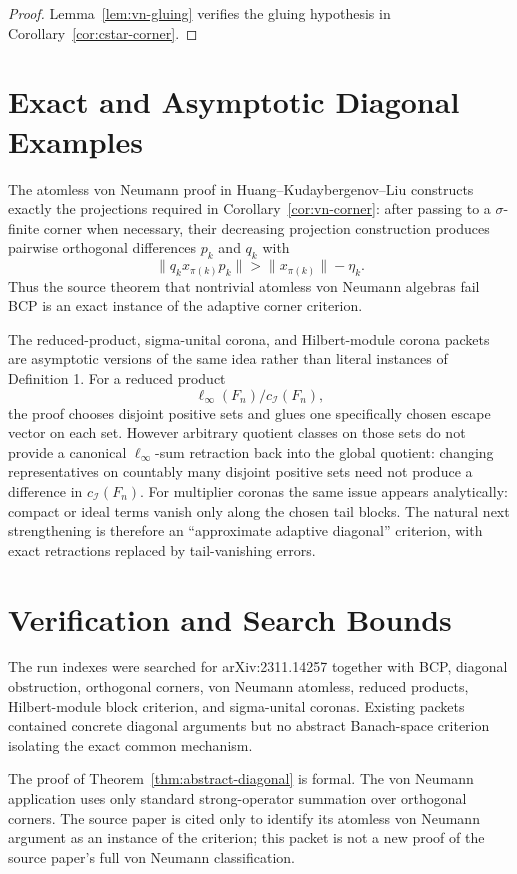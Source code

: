 \documentclass[11pt]{article}
\newcommand{\cI}{\mathcal I}
\begin{document}
\begin{proof}
Lemma~\ref{lem:vn-gluing} verifies the gluing hypothesis in
Corollary~\ref{cor:cstar-corner}.
\end{proof}

\section*{Exact and Asymptotic Diagonal Examples}

The atomless von Neumann proof in Huang--Kudaybergenov--Liu constructs exactly
the projections required in Corollary~\ref{cor:vn-corner}: after passing to a
\(\sigma\)-finite corner when necessary, their decreasing projection
construction produces pairwise orthogonal differences \(p_k\) and \(q_k\)
with
\[
        \|q_kx_{\pi(k)}p_k\|
        >
        \|x_{\pi(k)}\|-\eta_k .
\]
Thus the source theorem that nontrivial atomless von Neumann algebras fail
BCP is an exact instance of the adaptive corner criterion.

The reduced-product, sigma-unital corona, and Hilbert-module corona packets
are asymptotic versions of the same idea rather than literal instances of
Definition 1.  For a reduced product
\[
        \ell_\infty(F_n)/c_\cI(F_n),
\]
the proof chooses disjoint positive sets and glues one specifically chosen
escape vector on each set.  However arbitrary quotient classes on those sets
do not provide a canonical \(\ell_\infty\)-sum retraction back into the global
quotient: changing representatives on countably many disjoint positive sets
need not produce a difference in \(c_\cI(F_n)\).  For multiplier coronas the
same issue appears analytically: compact or ideal terms vanish only along the
chosen tail blocks.  The natural next strengthening is therefore an
``approximate adaptive diagonal'' criterion, with exact retractions replaced
by tail-vanishing errors.

\section*{Verification and Search Bounds}

The run indexes were searched for arXiv:2311.14257 together with BCP,
diagonal obstruction, orthogonal corners, von Neumann atomless, reduced
products, Hilbert-module block criterion, and sigma-unital coronas.  Existing
packets contained concrete diagonal arguments but no abstract Banach-space
criterion isolating the exact common mechanism.

The proof of Theorem~\ref{thm:abstract-diagonal} is formal.  The von Neumann
application uses only standard strong-operator summation over orthogonal
corners.  The source paper is cited only to identify its atomless von Neumann
argument as an instance of the criterion; this packet is not a new proof of
the source paper's full von Neumann classification.
\end{document}
